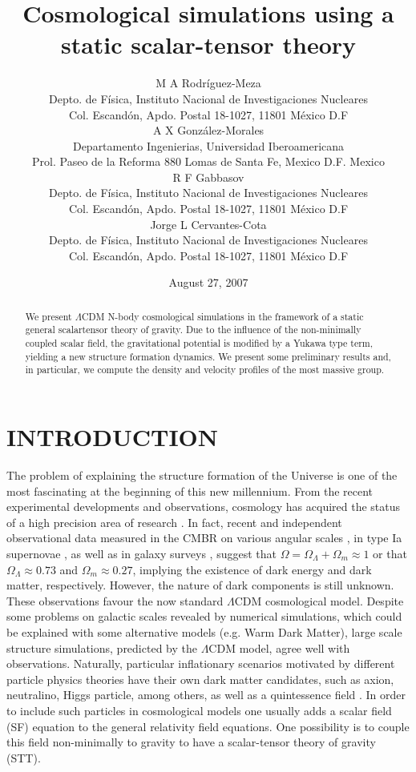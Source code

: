 \documentclass{article}
\title{Cosmological simulations using a static scalar-tensor theory}
\date{August 27, 2007}
\author{{ M A Rodríguez-Meza} \\
	Depto. de Física, Instituto Nacional de Investigaciones Nucleares\\
	Col. Escandón, Apdo. Postal 18-1027, 11801 México D.F\\
	\And
	{A X González-Morales} \\
	Departamento Ingenierias, Universidad Iberoamericana\\
	Prol. Paseo de la Reforma 880 Lomas de Santa Fe, Mexico D.F. Mexico\\
	\And
	{R F Gabbasov} \\
	Depto. de Física, Instituto Nacional de Investigaciones Nucleares\\
	Col. Escandón, Apdo. Postal 18-1027, 11801 México D.F\\
	\And
	{Jorge L Cervantes-Cota} \\
	Depto. de Física, Instituto Nacional de Investigaciones Nucleares\\
	Col. Escandón, Apdo. Postal 18-1027, 11801 México D.F\\
}
\begin{document}
\maketitle

\begin{abstract}
We present $\Lambda$CDM N-body cosmological simulations in the framework of a static general scalartensor
theory of gravity. Due to the influence of the non-minimally coupled scalar field, the gravitational
potential is modified by a Yukawa type term, yielding a new structure formation dynamics.
We present some preliminary results and, in particular, we compute the density and velocity profiles
of the most massive group.
\end{abstract}

\section{INTRODUCTION}
The problem of explaining the structure formation of
the Universe is one of the most fascinating at the beginning
of this new millennium. From the recent experimental
developments and observations, cosmology has
acquired the status of a high precision area of research \cite{148_breton}. In fact, recent and independent observational data
measured in the CMBR on various angular scales \cite{3_deBernardis2000}, in
type Ia supernovae \cite{148_breton}, as well as in galaxy surveys \cite{5_Efstathiou2002,6_peacock},
suggest that $\Omega=\Omega_{\Lambda}+\Omega_{m} \approx 1$ or that $\Omega_{\Lambda} \approx 0.73$ and $\Omega_{m} \approx 0.27$, implying the existence of dark energy and
dark matter, respectively. However, the nature of dark
components is still unknown. These observations favour
the now standard $\Lambda$CDM cosmological model. Despite
some problems on galactic scales revealed by numerical
simulations, which could be explained with some alternative
models (e.g. Warm Dark Matter), large scale structure
simulations, predicted by the $\Lambda$CDM model, agree
well with observations. Naturally, particular inflationary
scenarios motivated by different particle physics theories
have their own dark matter candidates, such as axion,
neutralino, Higgs particle, among others, as well as a
quintessence field \cite{7_Caldwell1998,148_breton}. In order to include such particles
in cosmological models one usually adds a scalar field (SF) equation to the general relativity field equations. One possibility is to couple this field non-minimally to gravity to have a scalar-tensor theory of gravity (STT).\\
\end{document}
